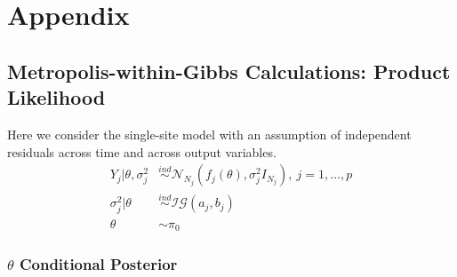 \documentclass[12pt]{article}
\begin{document}
\section{Appendix}

\subsection{Metropolis-within-Gibbs Calculations: Product Likelihood}
Here we consider the single-site model with an assumption of independent residuals across time and across output variables.
\begin{align*}
Y_j|\theta, \sigma_j^2 &\overset{ind}{\sim} \mathcal{N}_{N_j}(f_j(\theta), \sigma_j^2 I_{N_j}), \ j = 1, \dots, p \\
\sigma_j^2 |\theta &\overset{ind}{\sim} \mathcal{IG}(a_j, b_j) \\
\theta &\sim \pi_0 
\end{align*}

\subsubsection{$\theta$ Conditional Posterior}
\end{document}
